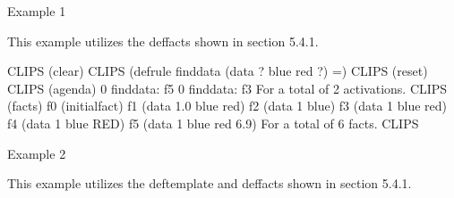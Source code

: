 \documentclass[letterpaper,10pt,english]{sphinxmanual}
\begin{document}
Example 1

This example utilizes the  deffacts shown in section 5.4.1.

\begin{sphinxVerbatim}[commandchars=\\\{\}]
    CLIPS\PYGZgt{} (clear)
    CLIPS\PYGZgt{}
    (defrule find\PYGZhy{}data
    (data ? blue red \PYGZdl{}?)
    =\PYGZgt{})
    CLIPS\PYGZgt{} (reset)
    CLIPS\PYGZgt{} (agenda)
    0 find\PYGZhy{}data: f\PYGZhy{}5
    0 find\PYGZhy{}data: f\PYGZhy{}3
    For a total of 2 activations.
    CLIPS\PYGZgt{} (facts)
    f\PYGZhy{}0 (initial\PYGZhy{}fact)
    f\PYGZhy{}1 (data 1.0 blue \PYGZdq{}red\PYGZdq{})
    f\PYGZhy{}2 (data 1 blue)
    f\PYGZhy{}3 (data 1 blue red)
    f\PYGZhy{}4 (data 1 blue RED)
    f\PYGZhy{}5 (data 1 blue red 6.9)
    For a total of 6 facts.
CLIPS\PYGZgt{}
\end{sphinxVerbatim}

Example 2

This example utilizes the  deftemplate and  deffacts
shown in section 5.4.1.
\end{document}
